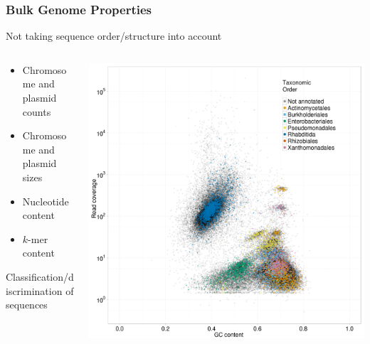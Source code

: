 \begin{frame}
  \frametitle{Bulk Genome Properties}
  Not taking sequence order/structure into account
  \begin{columns}[T]
    \begin{column}{5cm}
      \begin{itemize}
        \item Chromosome and plasmid counts
        \item Chromosome and plasmid sizes
        \item Nucleotide content
        \item $k$-mer content
      \end{itemize}    
      Classification/discrimination of sequences\\
    \end{column}
    \begin{column}{5cm}
      \includegraphics[width=1\textwidth]{images/blobology}
    \end{column}
  \end{columns}
\end{frame}

